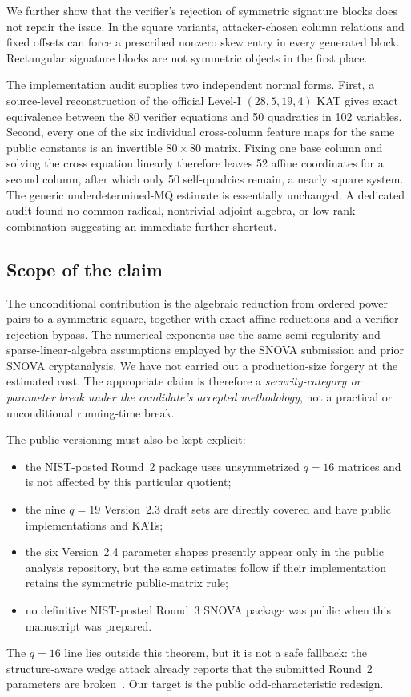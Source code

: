 \documentclass[runningheads]{llncs}
\newcommand{\SNOVA}{\textsf{SNOVA}}
\begin{document}
We further show that the verifier's rejection of symmetric signature blocks does not repair the issue.  In the square variants, attacker-chosen column relations and fixed offsets can force a prescribed nonzero skew entry in every generated block.  Rectangular signature blocks are not symmetric objects in the first place.

The implementation audit supplies two independent normal forms.  First, a source-level reconstruction of the official Level-I $(28,5,19,4)$ KAT gives exact equivalence between the 80 verifier equations and 50 quadratics in 102 variables.  Second, every one of the six individual cross-column feature maps for the same public constants is an invertible $80\times80$ matrix.  Fixing one base column and solving the cross equation linearly therefore leaves 52 affine coordinates for a second column, after which only 50 self-quadrics remain, a nearly square system.  The generic underdetermined-MQ estimate is essentially unchanged.  A dedicated audit found no common radical, nontrivial adjoint algebra, or low-rank combination suggesting an immediate further shortcut.

\subsection{Scope of the claim}

The unconditional contribution is the algebraic reduction from ordered power pairs to a symmetric square, together with exact affine reductions and a verifier-rejection bypass.  The numerical exponents use the same semi-regularity and sparse-linear-algebra assumptions employed by the \SNOVA{} submission and prior \SNOVA{} cryptanalysis.  We have not carried out a production-size forgery at the estimated cost.  The appropriate claim is therefore a \emph{security-category or parameter break under the candidate's accepted methodology}, not a practical or unconditional running-time break.

The public versioning must also be kept explicit:
\begin{itemize}
\item the NIST-posted Round~2 package uses unsymmetrized $q=16$ matrices and is not affected by this particular quotient;
\item the nine $q=19$ Version~2.3 draft sets are directly covered and have public implementations and KATs;
\item the six Version~2.4 parameter shapes presently appear only in the public analysis repository, but the same estimates follow if their implementation retains the symmetric public-matrix rule;
\item no definitive NIST-posted Round~3 \SNOVA{} package was public when this manuscript was prepared.
\end{itemize}
The $q=16$ line lies outside this theorem, but it is not a safe fallback: the structure-aware wedge attack already reports that the submitted Round~2 parameters are broken~\cite{BrosEtAl2026SNOVAWedge}.  Our target is the public odd-characteristic redesign.
\end{document}
